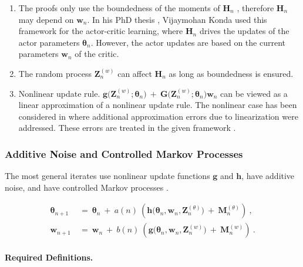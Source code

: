 \documentclass{article}
\newcommand\Bg{\bm{g}}
\newcommand\Bh{\bm{h}}
\newcommand\Bw{\bm{w}}
\newcommand\BG{\bm{G}}
\newcommand\BH{\bm{H}}
\newcommand\BM{\bm{M}}
\newcommand\BZ{\bm{Z}}
\newcommand\Bth{\bm{\theta}}
\begin{document}
\begin{enumerate}[label=\textbf{(C\arabic*)}]
\item
The proofs only use the boundedness of the moments of $\BH_n$ \cite{Konda:02,Konda:03},
therefore $\BH_n$ may depend on $\Bw_n$.
In his PhD thesis \cite{Konda:02}, Vijaymohan Konda used this framework for
the actor-critic learning, where $\BH_n$ drives the updates of the
actor parameters $\Bth_n$.
However, the actor updates are based on the current parameters $\Bw_n$ of
the critic.
\item
The random process $\BZ^{(w)}_{n}$ can affect $\BH_n$ as long as
boundedness is ensured.
\item Nonlinear update rule.
$\Bg\big(\BZ^{(w)}_n; \Bth_n \big) \ + \ \BG\big(
\BZ^{(w)}_n ; \Bth_n\big)\Bw_n$ can be viewed as a linear approximation of a
nonlinear update rule. The nonlinear case has been considered in
\cite{Konda:02} where additional approximation errors due to
linearization were addressed. These errors are
treated in the given framework \cite{Konda:02}.
\end{enumerate}


\subsubsection{Additive Noise and Controlled Markov Processes}
\label{sec:addnoisecmp}
The most general iterates use nonlinear update functions $\Bg$ and
$\Bh$, have additive noise,
and have controlled Markov processes \cite{Karmakar:17}.

\begin{align}
\label{eq:iter1Karmakar}
\Bth_{n+1} \ &= \ \Bth_n \ + \ a(n) \ \left(\Bh\big(\Bth_n, \Bw_n,
               \BZ^{(\theta)}_n \big) \ + \ \BM^{(\theta)}_{n}\right) \ ,\\
\label{eq:iter2Karmakar}
\Bw_{n+1} \ &= \ \Bw_n  \ + \ b(n)\ \left(\Bg\big(\Bth_n, \Bw_n,
              \BZ^{(w)}_n\big) \ + \ \BM^{(w)}_{n}\right) \ .
\end{align}

\paragraph{Required Definitions.}
\end{document}
